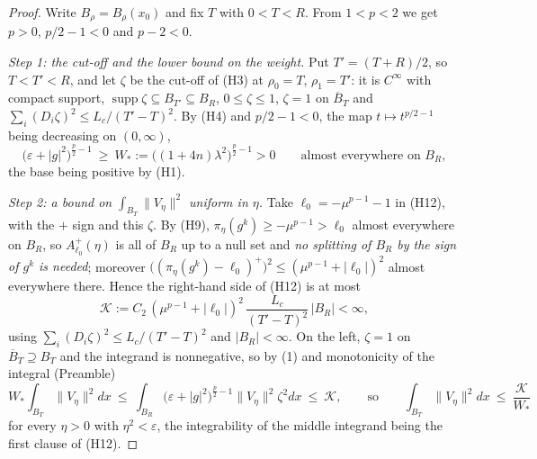 \begin{proof}
Write $B_\rho=B_\rho(x_0)$ and fix $T$ with $0<T<R$.  From $1<p<2$ we get
$p>0$, $p/2-1<0$ and $p-2<0$.

\emph{Step 1: the cut-off and the lower bound on the weight.}  Put
$T'=(T+R)/2$, so $T<T'<R$, and let $\zeta$ be the cut-off of (H3) at
$\rho_0=T$, $\rho_1=T'$: it is $C^\infty$ with compact support,
$\operatorname{supp}\zeta\subseteq B_{T'}\subseteq B_R$, $0\le\zeta\le1$,
$\zeta=1$ on $\overline B_T$ and $\sum_i(D_i\zeta)^2\le L_c/(T'-T)^2$.  By (H4)
and $p/2-1<0$, the map $t\mapsto t^{p/2-1}$ being decreasing on $(0,\infty)$,
\[
\bigl(\varepsilon+|g|^2\bigr)^{\frac p2-1}
\ \ge\ W_\ast:=\bigl((1+4n)\lambda^2\bigr)^{\frac p2-1}>0
\qquad\text{almost everywhere on }B_R ,
\tag{1}
\]
the base being positive by (H1).

\emph{Step 2: a bound on $\int_{B_T}\|V_\eta\|^2$ uniform in $\eta$.}  Take
$\ell_0=-\mu^{p-1}-1$ in (H12), with the $+$ sign and this $\zeta$.  By (H9),
$\pi_\eta(g^k)\ge-\mu^{p-1}>\ell_0$ almost everywhere on $B_R$, so
$A^{+}_{\ell_0}(\eta)$ is all of $B_R$ up to a null set and \emph{no splitting
of $B_R$ by the sign of $g^k$ is needed}; moreover
$\bigl((\pi_\eta(g^k)-\ell_0)^{+}\bigr)^2\le(\mu^{p-1}+|\ell_0|)^2$ almost
everywhere there.  Hence the right-hand side of (H12) is at most
\[
\mathcal K:=C_2\,(\mu^{p-1}+|\ell_0|)^2\,\frac{L_c}{(T'-T)^2}\,|B_R|<\infty ,
\]
using $\sum_i(D_i\zeta)^2\le L_c/(T'-T)^2$ and $|B_R|<\infty$.  On the left,
$\zeta=1$ on $\overline B_T\supseteq B_T$ and the integrand is nonnegative, so
by (1) and monotonicity of the integral (Preamble)
\[
W_\ast\int_{B_T}\|V_\eta\|^2dx
\ \le\ \int_{B_R}\bigl(\varepsilon+|g|^2\bigr)^{\frac p2-1}\|V_\eta\|^2\zeta^2dx
\ \le\ \mathcal K ,
\qquad\text{so}\qquad
\int_{B_T}\|V_\eta\|^2dx\ \le\ \frac{\mathcal K}{W_\ast}
\tag{2}
\]
for every $\eta>0$ with $\eta^2<\varepsilon$, the integrability of the middle
integrand being the first clause of (H12).


\end{proof}
